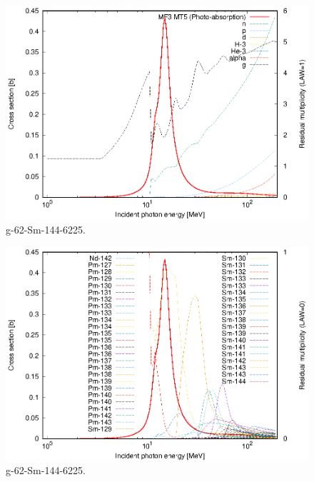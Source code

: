\begin{figure}
 \includegraphics[width=\linewidth]{eps/g_62-Sm-144_6225.eps}
  \caption{g-62-Sm-144-6225.}
\end{figure}
\begin{figure}
 \includegraphics[width=\linewidth]{eps-law0/g_62-Sm-144_6225.eps}
 \caption{g-62-Sm-144-6225.}
\end{figure}
\newpage \clearpage

